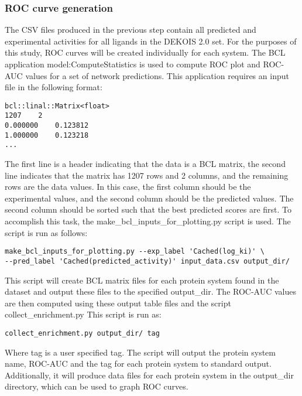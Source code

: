 \subsubsection{\acs{ROC} curve generation}
The \ac{CSV} files produced in the previous step contain all predicted and experimental activities for all ligands in the DEKOIS 2.0 set.
For the purposes of this study, \ac{ROC} curves will be created individually for each system. 
The \ac{BCL} application model:ComputeStatistics is used to compute \ac{ROC} plot and \ac{ROC-AUC} values for a set of network predictions.
This application requires an input file in the following format:
\singlespace
\begin{verbatim}
bcl::linal::Matrix<float>
1207	2
0.000000	0.123812
1.000000	0.123218
...
\end{verbatim}
\doublespace
The first line is a header indicating that the data is a \ac{BCL} matrix, the second line indicates that the matrix has 1207 rows and 2 columns, and the remaining rows are the data values.
In this case, the first column should be the experimental values, and the second column should be the predicted values.
The second column should be sorted such that the best predicted scores are first.
To accomplish this task, the make\_bcl\_inputs\_for\_plotting.py script is used. 
The script is run as follows:
\singlespace
\begin{verbatim}
make_bcl_inputs_for_plotting.py --exp_label 'Cached(log_ki)' \
--pred_label 'Cached(predicted_activity)' input_data.csv output_dir/
\end{verbatim}
\doublespace
This script will create \ac{BCL} matrix files for each protein system found in the dataset and output these files to the specified output\_dir.
The \ac{ROC-AUC} values are then computed using these output table files and the script collect\_enrichment.py
This script is run as:
\singlespace
\begin{verbatim}
collect_enrichment.py output_dir/ tag
\end{verbatim}
\doublespace
Where tag is a user specified tag.
The script will output the protein system name, \ac{ROC-AUC} and the tag for each protein system to standard output.
Additionally, it will produce data files for each protein system in the output\_dir directory, which can be used to graph \ac{ROC} curves. 
